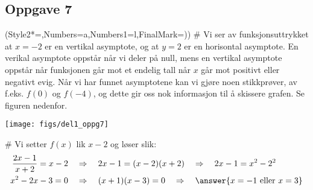 \subsection*{Oppgave 7}
\begin{easylist}[enumerate]
	\ListProperties(Style2*=,Numbers=a,Numbers1=l,FinalMark={)})
	# Vi ser av funksjonsuttrykket at $x = -2$ er en vertikal asymptote, og at $y = 2$ er en horisontal asymptote. 
	En verikal asymptote oppstår når vi deler på null, mens en vertikal asymptote oppstår når funksjonen går mot et endelig tall når $x$ går mot positivt eller negativt evig.
	Når vi har funnet asymptotene kan vi gjøre noen stikkprøver, av f.eks. $f(0)$ og $f(-4)$, og dette gir oss nok informasjon til å skissere grafen.
	Se figuren nedenfor.
	\begin{center}
		\texttt{[image: figs/del1\_oppg7]}
	\end{center}
	
	# Vi setter $f(x)$ lik $x-2$ og løser slik:
	\begin{align*}
		\frac{2x - 1}{x + 2} = x - 2 &\quad \Rightarrow \quad 2x - 1 = (x-2)(x+2) \quad \Rightarrow \quad 2x - 1 = x^2 - 2^2 \\
		x^2 - 2x - 3 = 0  &\quad \Rightarrow \quad (x+1)(x-3) = 0 \quad \Rightarrow \quad
		\answer{x = -1 \text{ eller } x=3}
	\end{align*}
\end{easylist}


